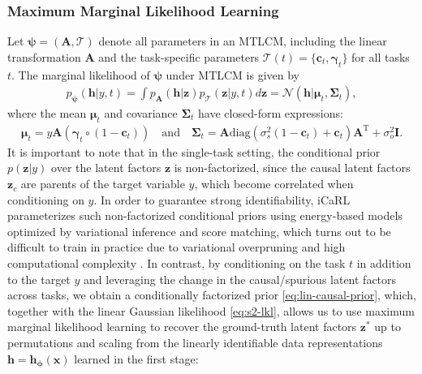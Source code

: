 \documentclass{article} %
\theoremstyle{plain}
\theoremstyle{definition}
\theoremstyle{remark}
\begin{document}
\subsubsection{Maximum Marginal Likelihood Learning}
\vspace{-0.75ex}
Let $\boldsymbol{\psi}=(\mathbf{A},\mathcal{T})$ denote all parameters in an MTLCM, including the linear transformation $\mathbf{A}$ and the task-specific parameters $\mathcal{T}(t)=\{\mathbf{c}_t,\boldsymbol{\gamma}_t\}$ for all tasks $t$. The marginal likelihood of $\boldsymbol{\psi}$ under MTLCM is given by
\begin{align}\label{eq:s2-mlkl}
    p_{\boldsymbol{\psi}}(\mathbf{h}|y,t)=\int p_{\mathbf{A}}(\mathbf{h}|\mathbf{z})p_{\mathcal{T}}(\mathbf{z}|y,t)d\mathbf{z}
    =\mathcal{N}(\mathbf{h}|\boldsymbol{\mu}_t,\boldsymbol{\Sigma}_t),
\end{align}
where the mean $\boldsymbol{\mu}_t$ and covariance $\boldsymbol{\Sigma}_t$ have closed-form expressions:
\begin{align}\label{eq:mtlcm-mlkl-mean-var}
    \boldsymbol{\mu}_t = y\mathbf{A}(\boldsymbol{\gamma}_t\circ(1-\mathbf{c}_t))
    \quad\text{and}\quad
    \boldsymbol{\Sigma}_t = \mathbf{A}\text{diag}(\sigma_{s}^{2}(1-\mathbf{c}_t)+\mathbf{c}_t)\mathbf{A}^{\text{T}}+\sigma_o^2\mathbf{I}.
\end{align}
It is important to note that in the single-task setting, the conditional prior $p(\mathbf{z}|y)$ over the latent factors $\mathbf{z}$ is non-factorized, since the causal latent factors $\mathbf{z}_c$ are parents of the target variable $y$, which become correlated when conditioning on $y$. In order to guarantee strong identifiability, iCaRL parameterizes such non-factorized conditional priors using energy-based models optimized by variational inference and score matching, which turns out to be difficult to train in practice due to variational overpruning \citep{trippe2018overpruning} and high computational complexity \citep{hyvarinen2005estimation}. In contrast, by conditioning on the task $t$ in addition to the target $y$ and leveraging the change in the causal/spurious latent factors across tasks, we obtain a conditionally factorized prior \eqref{eq:lin-causal-prior}, which, together with the linear Gaussian likelihood \eqref{eq:s2-lkl}, allows us to use maximum marginal likelihood learning to recover the ground-truth latent factors $\mathbf{z}^*$ up to permutations and scaling from the linearly identifiable data representations $\mathbf{h}=\mathbf{h}_{\boldsymbol{\phi}}(\mathbf{x})$ learned in the first stage:
\end{document}
